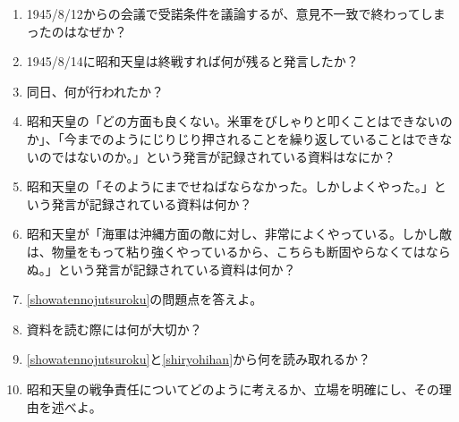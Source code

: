 \documentclass[]{jsarticle}
\begin{document}
\begin{enumerate}
	\item 1945/8/12からの会議で受諾条件を議論するが、意見不一致で終わってしまったのはなぜか？
	\item 1945/8/14に昭和天皇は終戦すれば何が残ると発言したか？
	\item 同日、何が行われたか？
	\\
	\item 昭和天皇の「どの方面も良くない。米軍をびしゃりと叩くことはできないのか」、「今までのようにじりじり押されることを繰り返していることはできないのではないのか。」という発言が記録されている資料はなにか？
	\item 昭和天皇の「そのようにまでせねばならなかった。しかしよくやった。」という発言が記録されている資料は何か？
	\item 昭和天皇が「海軍は沖縄方面の敵に対し、非常によくやっている。しかし敵は、物量をもって粘り強くやっているから、こちらも断固やらなくてはならぬ。」という発言が記録されている資料は何か？
	\item \ref{showatennojutsuroku}の問題点を答えよ。
	\item 資料を読む際には何が大切か？\label{shiryohihan}
	\item \ref{showatennojutsuroku}と\ref{shiryohihan}から何を読み取れるか？
	\\
	\item 昭和天皇の戦争責任についてどのように考えるか、立場を明確にし、その理由を述べよ。
\end{enumerate}

\begin{comment}
	\begin{figure}[htbp]
		\begin{center}
			\texttt{[image: ./src/RC\_series\_circuit\_c.png]}
			\caption{RC直列回路 ($V_C$の測定)}
			\label{fig:RC_series_circuit_c}
		\end{center}
	\end{figure}

	\begin{equation}
		\label{Relationship_between_impedance_Z}
		V = ZI [\si{\volt}], I = \frac{V}{Z} [\si{\ampere}], Z = \frac{V}{I}[\si{\ohm}]
	\end{equation}

	\begin{table}[h]
		\caption{計測および実験補助器具}
		\label{tab:fixtures}
		\centering
		\begin{tabular}{|c|c|c|c|}
			\hline
			器具名 & 製造元 & 計器番号 & 定格 \\
		\end{tabular}
	\end{table}
\end{comment}
\end{document}
